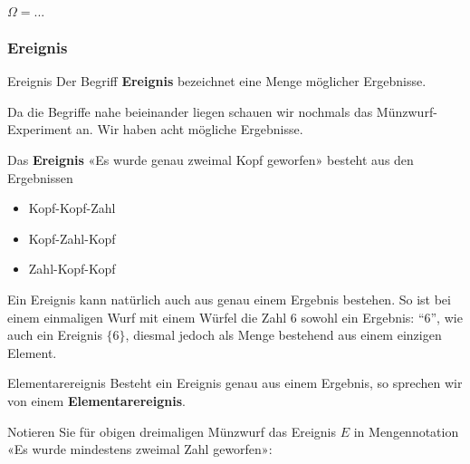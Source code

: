 $\Omega=...$



\subsubsection{Ereignis}
\begin{definition}{Ereignis}{}
Der Begriff \textbf{Ereignis} bezeichnet eine Menge möglicher
Ergebnisse.
\end{definition}

Da die Begriffe nahe beieinander liegen schauen wir
nochmals das Münzwurf-Experiment an. Wir haben acht mögliche
Ergebnisse. 

Das \textbf{Ereignis} «Es wurde genau zweimal Kopf geworfen» besteht
aus den Ergebnissen

\begin{itemize}
\item Kopf-Kopf-Zahl
\item Kopf-Zahl-Kopf
\item Zahl-Kopf-Kopf
\end{itemize}

\begin{bemerkung}{}{}
  Ein Ereignis kann natürlich auch aus genau einem Ergebnis bestehen. So ist bei einem einmaligen Wurf mit einem Würfel die Zahl 6 sowohl ein Ergebnis: ``6'', wie auch ein Ereignis $\{6\}$, diesmal jedoch als Menge bestehend aus einem einzigen Element. 
  \end{bemerkung}

\begin{definition}{Elementarereignis}{}
Besteht ein Ereignis genau aus einem Ergebnis, so sprechen wir von einem \textbf{Elementarereignis}.
\end{definition}

Notieren Sie für obigen dreimaligen Münzwurf das Ereignis $E$ in Mengennotation «Es wurde mindestens
zweimal Zahl geworfen»:

